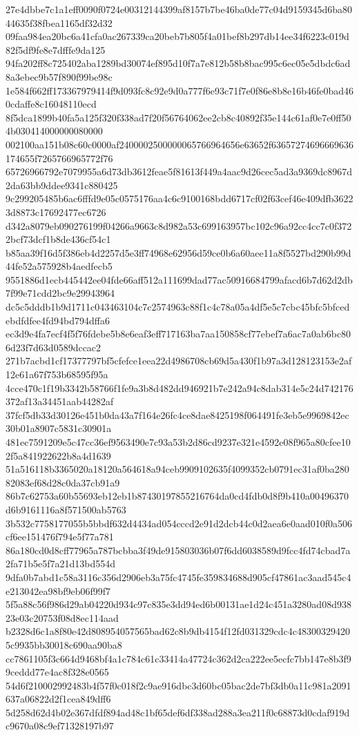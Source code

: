 {27e4dbbe7c1a1eff0090f0724e00312144399af8157b7be46ba0de77c04d9159345d6ba8044635f38fbea1165df32d32
09faa984ea20bc6a41cfa0ac267339ca20beb7b805f4a01bef8b297db14ee34f6223c019d82f5df9fe8e7dfffe9da125
94fa202ff8c725402aba1289bd30074ef895d10f7a7e812b58b8bac995c6ec05e5dbdc6ad8a3ebec9b57f890f99be98c
1e584f662ff173367979414f9d093fc8c92e9d0a777f6e93c71f7e0f86e8b8e16b46fe0bad460cdaffe8c16048110ecd
8f5dca1899b40fa5a125f320f338ad7f20f56764062ee2cb8c40892f35e144c61af0e7e0ff504b030414000000080000
002100aa151b08c60c0000af2400002500000065766964656e63652f63657274696669636174655f7265766965772f76
65726966792e7079955a6d73db3612feae5f81613f449a4aac9d26cec5ad3a9369dc8967d2da63bb9ddee9341c880425
9c299205485b6ac6fffd9e05c0575176aa4c6c9100168bdd6717cf02f63cef46e409dfb36223d8873c17692477ec6726
d342a8079eb090276199f04266a9663c8d982a53c699163957bc102c96a92cc4cc7c0f3722bcf73dcf1b8de436cf54c1
b85aa39f16d5f386eb4d2257d5e3ff74968e62956d59ce0b6a60aee11a8f5527bd290b99d44fe52a575928b4aedfecb5
9551886d1ecb445442ee04fde66aff512a111699dad77ac50916684799afacd6b7d62d2db7f99e71cdd2bc9e29943964
dc5c5dddb1b9d1711c043463104c7c2574963c88f1c4c78a05a4df5e5c7cbc45bfc5bfcedebdfdfee4fd94bd794dffa6
ec3d9e4fa7ecf4f5f76fdebe5b8e6eaf3eff717163ba7aa150858cf77ebef7a6ac7a0ab6bc806d23f7d63d0589dccac2
271b7acbd1cf17377797bf5cfefce1eea22d4986708cb69d5a430f1b97a3d128123153e2af12e61a67f753b68595f95a
4cce470c1f19b3342b58766f1fe9a3b8d482dd946921b7e242a94c8dab314e5c24d742176372af13a34451aab44282af
37fcf5db33d30126e451b0da43a7f164e26fc4ce8dae8425198f064491fe3eb5e9969842ec30b01a8907c5831c30901a
481ec7591209e5c47cc36ef9563490e7c93a53b2d86cd9237e321e4592e08f965a80cfee102f5a841922622b8a4d1639
51a516118b3365020a18120a564618a94ceb9909102635f4099352cb0791ec31af0ba28082083ef68d28c0da37cb91a9
86b7c62753a60b55693eb12eb1b87430197855216764da0cd4fdb0d8f9b410a00496370d6b9161116a8f571500ab5763
3b532c7758177055b5bbdf632d4434ad054cccd2e91d2dcb44c0d2aea6e0aad010f0a506cf6ee151476f794e5f77a781
86a180cd0d8cff77965a787bcbba3f49de915803036b07f6dd6038589d9fcc4fd74cbad7a2fa71b5e5f7a21d13bd554d
9dfa0b7abd1c58a3116c356d2906eb3a75fc4745fe359834688d905cf47861ac3aad545c4e213042ea98bf9eb06f99f7
5f5a88c56f986d29ab04220d934c97c835e3dd94ed6b00131ae1d24c451a3280ad08d93823e03c20753f08d8ec114aad
b2328d6c1a8f80e42d808954057565bad62c8b9db4154f12fd031329cdc4c483003294205c9935bb30018c690aa90ba8
cc7861105f3c664d9468bf4a1c784c61c33414a47724c362d2ca222ee5ecfc7bb147e8b3f99ceddd77e4ac8f328e0565
54d6f210002992483b4f57f0c018f2c9ae916dbc3d60bc05bac2de7bf3db0a11c981a2091637a06822d2f1cea849dff6
5d258d62d4b02e367dfdf894ad48c1bf65def6df338ad288a3ea211f0c68873d0cdaf919dc9670a08c9ef71328197b97
}
